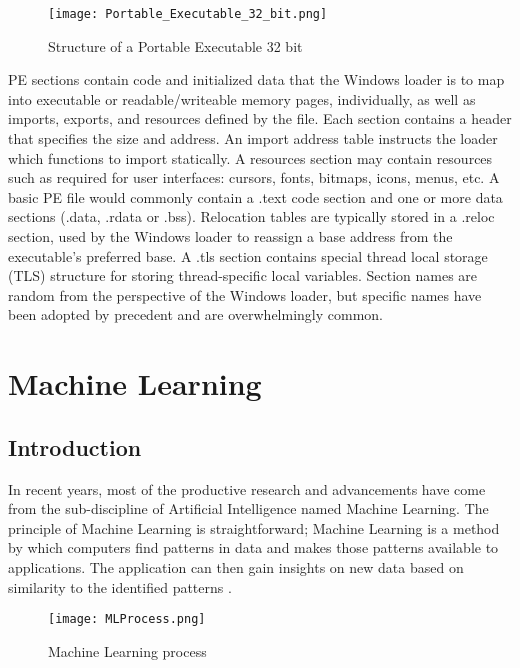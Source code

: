 \begin{figure}[H] 
\centering    
\texttt{[image: Portable\_Executable\_32\_bit.png]}
\caption{Structure of a Portable Executable 32 bit \cite{wikipefile}}
\label{fig:pe32bit}
\end{figure}

PE sections contain code and initialized data that the Windows loader is to map into executable or readable/writeable memory pages, individually, as well as imports, exports, and resources defined by the file. Each section contains a header that specifies the size and address. An import address table instructs the loader which functions to import statically. A resources section may contain resources such as required for user interfaces: cursors, fonts, bitmaps, icons, menus, etc. A basic PE file would commonly contain a .text code section and one or more data sections (.data, .rdata or .bss). Relocation tables are typically stored in a .reloc section, used by the Windows loader to reassign a base address from the executable’s preferred base. A .tls section contains special thread local storage (TLS) structure for storing thread-specific local variables. Section names are random from the perspective of the Windows loader, but specific names have been adopted by precedent and are overwhelmingly common.

\section{Machine Learning}

\subsection{Introduction}
\label{ssec:machine-learning-intro}

In recent years, most of the productive research and advancements have come from the sub-discipline of Artificial Intelligence named Machine Learning. The principle of Machine Learning is straightforward; Machine Learning is a method by which computers find patterns in data and makes those patterns available to applications. The application can then gain insights on new data based on similarity to the identified patterns \cite{martin2016machine}.

\begin{figure}[htbp!] 
\centering    
\texttt{[image: MLProcess.png]}
\caption{Machine Learning process \cite{martin2016machine}}
\label{fig:ml-process}
\end{figure}

